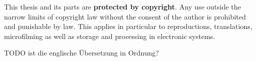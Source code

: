 \begin{titlepage}
\singlespacing
\small
\noindent This thesis and its parts are \textbf{protected by copyright}. Any use outside the narrow limits of copyright law without the consent of the author is prohibited and punishable by law. This applies in particular to reproductions, translations, microfilming as well as storage and processing in electronic systems.


TODO ist die englische Übersetzung in Ordnung?


\end{titlepage}
